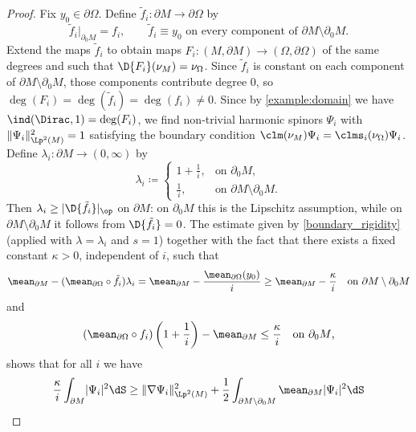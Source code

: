 \documentclass[a4paper,11pt]{amsart}
\numberwithin{equation}{section}
\begin{document}
 \begin{proof}
    Fix \(y_0 \in \partial\Omega\). Define \(\tilde f_i \colon \partial M \to \partial\Omega\) by
    \[
        \tilde f_i|_{\partial_0 M} = f_i, \qquad \tilde f_i \equiv y_0 \text{ on every component of \(\partial M \setminus \partial_0 M\).}
    \]
    Extend the maps \(\tilde f_i\) to obtain maps \(F_i \colon (M, \partial M) \to (\Omega, \partial \Omega)\) of the same degrees and such that \(\D{F_i}(\nu_M) = \nu_\Omega\).
    Since \(\tilde f_i\) is constant on each component of \(\partial M \setminus \partial_0 M\), those components contribute degree \(0\), so \(\deg(F_i) = \deg(\tilde f_i) = \deg(f_i) \neq 0\).
    Since by \cref{example:domain} we have \(\ind(\Dirac, 1) = \deg(F_i)\), we find non-trivial harmonic spinors \(\Psi_i\) with \(\|\Psi_i\|_{\Lp^2(M)}^2 = 1\) satisfying the boundary condition \(\clm(\nu_M) \Psi_i = \clms_i(\nu_\Omega) \Psi_i\).
    Define \(\lambda_i \colon \partial M \to (0,\infty)\) by
    \[
        \lambda_i \coloneqq \begin{cases}
            1+\frac{1}{i}, & \text{on \(\partial_0 M\),}\\[2pt]
            \frac{1}{i}, & \text{on \(\partial M \setminus \partial_0 M\).}
        \end{cases}
    \]
    Then \(\lambda_i \geq \lvert \D{\tilde f_i} \rvert_{\op}\) on \(\partial M\): on \(\partial_0 M\) this is the Lipschitz assumption, while on \(\partial M \setminus \partial_0 M\) it follows from \(\D{\tilde f_i} = 0\).
    The estimate given by \cref{boundary_rigidity} (applied with \(\lambda = \lambda_i\) and \(s = 1\)) together with the fact that there exists a fixed constant \(\kappa > 0\), independent of \(i\), such that
    \[
        \mean_{\partial M} - (\mean_{\partial\Omega}\circ \tilde f_i)\lambda_i
        =
        \mean_{\partial M} - \frac{\mean_{\partial\Omega}(y_0)}{i}
        \geq
        \mean_{\partial M} - \frac{\kappa}{i}
        \quad \text{on \(\partial M\setminus\partial_0 M\)}
    \]
    and
    \[
        (\mean_{\partial\Omega} \circ f_i)\left(1+\frac{1}{i}\right) - \mean_{\partial M} \leq \frac{\kappa}{i}
        \quad \text{on \(\partial_0 M\),}
    \]
    shows that for all \(i\) we have
    \begin{align}
        \frac \kappa i \int_{\partial M}\lvert \Psi_i \rvert^2 \dS \geq \| &\nabla \Psi_i \|_{\Lp^2(M)}^2
        + \frac{1}{2}\int_{\partial M \setminus \partial_0 M}\mean_{\partial M}\lvert \Psi_i \rvert^2 \dS  \label{eq:applied_almost_rigid_estimate}\\

\end{align}
\end{proof}
\end{document}
